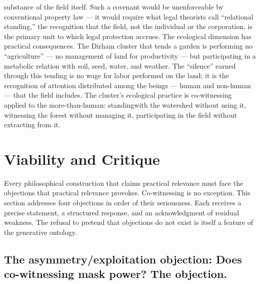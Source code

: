substance of the field itself. Such a covenant would be unenforceable by conventional property law — it would require what legal theorists call “relational standing,” the recognition that the field, not the individual or the corporation, is the primary unit to which legal protection accrues. The ecological dimension has practical consequences. The Dirham cluster that tends a garden is performing no “agriculture” — no management of land for productivity — but participating in a metabolic relation with soil, seed, water, and weather. The “silence” earned through this tending is no wage for labor performed on the land; it is the recognition of attention distributed among the beings — human and non-human — that the field includes. The cluster’s ecological practice is co-witnessing applied to the more-than-human: standingwith the watershed without using it, witnessing the forest without managing it, participating in the field without extracting from it.

\section{Viability and Critique}

Every philosophical construction that claims practical relevance must face the objections that practical relevance provokes. Co-witnessing is no exception. This section addresses four objections in order of their seriousness. Each receives a precise statement, a structured response, and an acknowledgment of residual weakness. The refusal to pretend that objections do not exist is itself a feature of the generative ontology.

\subsection{The asymmetry/exploitation objection: Does co-witnessing mask power? The objection.}

